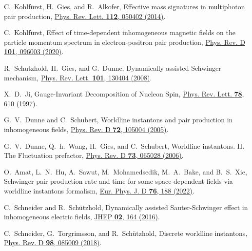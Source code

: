 \documentclass[prl,twocolumn,floatfix,amsmath,nofootinbib,superscriptaddress,amssymb,preprintnumbers,floatfix]{revtex4-1}
\begin{document}
\begin{thebibliography}{apsrev4-1}
C.~Kohlf\"urst, H.~Gies, and R.~Alkofer,
Effective mass signatures in multiphoton pair production,
\href{https://journals.aps.org/prl/abstract/10.1103/PhysRevLett.112.050402}{Phys. Rev. Lett. \textbf{112}, 050402 (2014)}.

C.~Kohlf\"urst,
Effect of time-dependent inhomogeneous magnetic fields on the particle momentum spectrum in electron-positron pair production,
\href{https://journals.aps.org/prd/abstract/10.1103/PhysRevD.101.096003}{Phys. Rev. D \textbf{101}, 096003 (2020)}.

R.~Schutzhold, H.~Gies, and G.~Dunne,
Dynamically assisted Schwinger mechanism,
\href{https://journals.aps.org/prl/abstract/10.1103/PhysRevLett.101.130404}{Phys. Rev. Lett. \textbf{101}, 130404 (2008)}.

X.~D.~Ji,
Gauge-Invariant Decomposition of Nucleon Spin,
\href{https://journals.aps.org/prl/pdf/10.1103/PhysRevLett.78.610}{Phys. Rev. Lett. \textbf{78}, 610 (1997)}.

G.~V.~Dunne and C.~Schubert,
Worldline instantons and pair production in inhomogeneous fields,
\href{https://journals.aps.org/prd/abstract/10.1103/PhysRevD.72.105004}{Phys. Rev. D \textbf{72}, 105004 (2005)}.

G.~V.~Dunne, Q.~h.~Wang, H.~Gies, and C.~Schubert,
Worldline instantons. II. The Fluctuation prefactor,
\href{https://journals.aps.org/prd/abstract/10.1103/PhysRevD.73.065028}{Phys. Rev. D \textbf{73}, 065028 (2006)}.

O.~Amat, L.~N.~Hu, A.~Sawut, M.~Mohamedsedik, M.~A.~Bake, and B.~S.~Xie,
Schwinger pair production rate and time for some space-dependent fields via worldline instantons formalism,
\href{https://link.springer.com/article/10.1140/epjd/s10053-022-00519-y}{Eur. Phys. J. D \textbf{76}, 188 (2022)}.

C.~Schneider and R.~Sch\"utzhold,
Dynamically assisted Sauter-Schwinger effect in inhomogeneous electric fields,
\href{https://link.springer.com/article/10.1007/JHEP02(2016)164}{JHEP \textbf{02}, 164 (2016)}.

C.~Schneider, G.~Torgrimsson, and R.~Sch\"utzhold,
Discrete worldline instantons,
\href{https://journals.aps.org/prd/abstract/10.1103/PhysRevD.98.085009}{Phys. Rev. D \textbf{98}, 085009 (2018)}.


\end{thebibliography}
\end{document}
